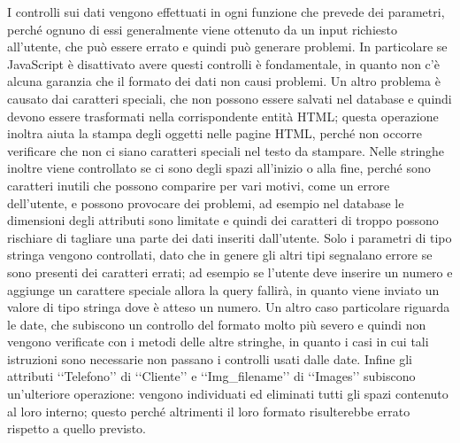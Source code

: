 {{		I controlli sui dati vengono effettuati in ogni funzione che prevede dei parametri, perché ognuno di essi generalmente viene ottenuto da un input richiesto all'utente, che può essere errato e quindi può generare problemi. In particolare se JavaScript è disattivato avere questi controlli è fondamentale, in quanto non c'è alcuna garanzia che il formato dei dati non causi problemi. Un altro problema è causato dai caratteri speciali, che non possono essere salvati nel database e quindi devono essere trasformati nella corrispondente entità HTML; questa operazione inoltra aiuta la stampa degli oggetti nelle pagine HTML, perché non occorre verificare che non ci siano caratteri speciali nel testo da stampare. Nelle stringhe inoltre viene controllato se ci sono degli spazi all'inizio o alla fine, perché sono caratteri inutili che possono comparire per vari motivi, come un errore dell'utente, e possono provocare dei problemi, ad esempio nel database le dimensioni degli attributi sono limitate e quindi dei caratteri di troppo possono rischiare di tagliare una parte dei dati inseriti dall'utente.
		Solo i parametri di tipo stringa vengono controllati, dato che in genere gli altri tipi segnalano errore se sono presenti dei caratteri errati; ad esempio se l'utente deve inserire un numero e aggiunge un carattere speciale allora la query fallirà, in quanto viene inviato un valore di tipo stringa dove è atteso un numero. Un altro caso particolare riguarda le date, che subiscono un controllo del formato molto più severo e quindi non vengono verificate con i metodi delle altre stringhe, in quanto i casi in cui tali istruzioni sono necessarie non passano i controlli usati dalle date. Infine gli attributi ‘‘Telefono’’ di ‘‘Cliente’’ e ‘‘Img_filename’’ di ‘‘Images’’ subiscono un'ulteriore operazione: vengono individuati ed eliminati tutti gli spazi contenuto al loro interno; questo perché altrimenti il loro formato risulterebbe errato rispetto a quello previsto.
	}
}